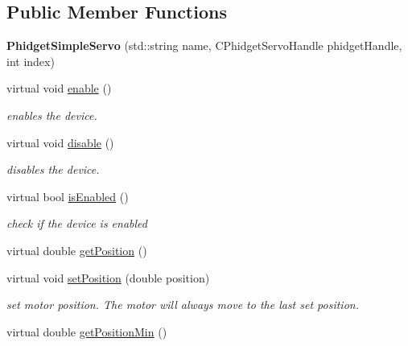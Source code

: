 \subsection*{Public Member Functions}
\begin{DoxyCompactItemize}
\item 
\hypertarget{classdrobot_1_1device_1_1actuator_1_1PhidgetSimpleServo_aa9a6d23acae8bb34343ba9c1bd7cc9a1}{{\bfseries Phidget\-Simple\-Servo} (std\-::string name, C\-Phidget\-Servo\-Handle phidget\-Handle, int index)}\label{classdrobot_1_1device_1_1actuator_1_1PhidgetSimpleServo_aa9a6d23acae8bb34343ba9c1bd7cc9a1}

\item 
virtual void \hyperlink{classdrobot_1_1device_1_1actuator_1_1PhidgetSimpleServo_ada2b985fee1f6a3891effad83fb7f738}{enable} ()
\begin{DoxyCompactList}\small\item\em enables the device. \end{DoxyCompactList}\item 
virtual void \hyperlink{classdrobot_1_1device_1_1actuator_1_1PhidgetSimpleServo_ad3dffbddc718a4f447a75bc90c0cb8f1}{disable} ()
\begin{DoxyCompactList}\small\item\em disables the device. \end{DoxyCompactList}\item 
virtual bool \hyperlink{classdrobot_1_1device_1_1actuator_1_1PhidgetSimpleServo_a6da8b37b613ecf9c8fc12f335ec90537}{is\-Enabled} ()
\begin{DoxyCompactList}\small\item\em check if the device is enabled \end{DoxyCompactList}\item 
virtual double \hyperlink{classdrobot_1_1device_1_1actuator_1_1PhidgetSimpleServo_a4b63fb0ed00c9594037a53827b3bfdb5}{get\-Position} ()
\item 
virtual void \hyperlink{classdrobot_1_1device_1_1actuator_1_1PhidgetSimpleServo_a9c08fb8a75bded49f53635d9184ce9e2}{set\-Position} (double position)
\begin{DoxyCompactList}\small\item\em set motor position. The motor will always move to the last set position. \end{DoxyCompactList}\item 
virtual double \hyperlink{classdrobot_1_1device_1_1actuator_1_1PhidgetSimpleServo_a37cbebc54653841ec66e3176a3e46241}{get\-Position\-Min} ()

\end{DoxyCompactItemize}
